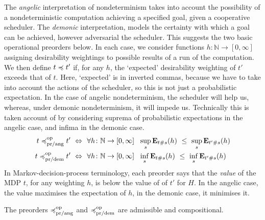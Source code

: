 The  \emph{angelic} interpretation of nondeterminism takes into account the possibility of a nondeterministic computation achieving a specified goal, given a cooperative scheduler.  The  \emph{demonic} interpretation, 
models the {certainty} with which a goal can be achieved, however adversarial the scheduler. 
This suggests the  two  basic operational preorders below. 
In each case, we consider functions $h \colon \mathbb{N} \to [0,\infty]$ assigning desirability weightings to possible results of a run of the computation. We then define 
$t \preccurlyeq t'$ if, for any $h$, the `expected' desirability weighting of $t'$ exceeds that of $t$. Here, `expected' is in inverted commas, because we have to take into account the actions of the scheduler, so this is not just a probabilistic expectation. In the case of 
angelic nondeterminism, the scheduler will help us, whereas, under demonic nondeterminism, it will impede us.
Technically this is taken account of by considering suprema of probabilistic expectations in the angelic case, and infima in the demonic case.
\begin{align*}
t \preccurlyeq^{\text{op}}_{\text{pr/ang}} t' ~ \Leftrightarrow ~ ~& \forall h \colon \mathbb{N} \to [0,\infty]~~ \sup_s  \mathbf{E}_{t\#s} (h)~ \leq~ \sup_s \mathbf{E}_{t'\#s} (h)
\\
t \preccurlyeq^{\text{op}}_{\text{pr/dem}} t' ~ \Leftrightarrow ~ ~& \forall h \colon \mathbb{N} \to [0,\infty]~~ \inf_s  \mathbf{E}_{t\#s} (h)~ \leq~ \inf_s \mathbf{E}_{t'\#s} (h)
\end{align*}
In Markov-decision-process terminology, each preorder says that the \emph{value} of the MDP $t$, for any weighting $h$, is below the value of of $t'$ for $H$. In the angelic case, the value maximises the expectation of $h$, in the demonic case, it minimises it. 
\begin{proposition}
The preorders $\preccurlyeq^{\text{op}}_{\text{pr/ang}}$ and $\preccurlyeq^{\text{op}}_{\text{pr/dem}}$ are admissible and compositional.
\end{proposition}



